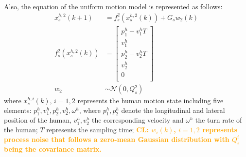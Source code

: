 \documentclass[journal]{IEEEtran}
\DeclareRobustCommand{\clnote}[1]{\ifthenelse{\boolean{include-notes}}%
	{\textcolor{orange}{\textbf{CL: #1}}}{}}
\begin{document}
	Also, the equation of the uniform motion model is represented as follows:
	\begin{subequations}
		\begin{align*}
		x_s^{h,2}(k+1)&= f_s^2(x_s^{h,2}(k))+G_sw_2(k) \label{eqn:h_d_dyn}\\
		f_s^2(x_s^{h,2}(k))&=\left[
		\begin{array}{c}
		p^h_1+v^h_1T\\
		v^h_1\\
		p^h_2+v^h_2T\\
		v^h_2\\
		0\\ 
		\end{array}\right] \\            
		w_2&\sim\mathcal{N}(0,Q^2_s)
		\end{align*}
	\end{subequations}\normalsize
	where $x_s^{h,i}(k)$, $i=1,2$ represents the human motion state including five elements: $p^h_1,v^h_1,p^h_2,v^h_2,\omega^h$, where $p^h_1,p^h_2$ denote the longitudinal and lateral position of the human, $v^h_1,v^h_2$ the corresponding velocity and $\omega^h$ the turn rate of the human; $T$ represents the sampling time; \clnote{$w_i(k)$, $i=1,2$ represents process noise that follows a zero-mean Gaussian distribution with $Q^i_s$ being the covariance matrix.}
	
\end{document}
